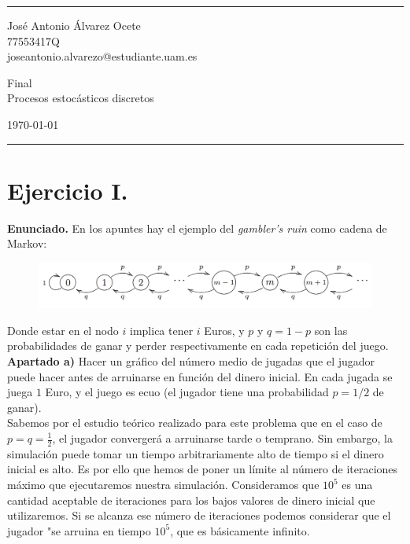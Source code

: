 \documentclass[a4paper]{article}
\begin{document}
	

\fancyhead[C]{}
\hrule \medskip %
\begin{minipage}{0.295\textwidth} 
	\raggedright
	\footnotesize
	José Antonio Álvarez Ocete \hfill\\   
	77553417Q \hfill\\
	joseantonio.alvarezo@estudiante.uam.es
\end{minipage}
\begin{minipage}{0.4\textwidth} 
	\centering 
	\large 
	Final \\ 
	\normalsize 
	Procesos estocásticos discretos\\ 
\end{minipage}
\begin{minipage}{0.295\textwidth} 
	\raggedleft
	\today\hfill\\
\end{minipage}
\medskip\hrule 
\bigskip


\section*{Ejercicio I.}

\textbf{Enunciado.} En los apuntes hay el ejemplo del \emph{gambler's ruin} como cadena de Markov:

\begin{figure}[H]
	\includegraphics[scale=.6]{figures/gamblers_ruin}
	\centering
\end{figure}

Donde estar en el nodo $i$ implica tener $i$ Euros, y $p$ y $q=1-p$ son las probabilidades de ganar y perder respectivamente en cada repetición del juego. \\

\textbf{Apartado a)} Hacer un gráfico del número medio de jugadas que el jugador puede hacer antes de arruinarse en función del dinero inicial. En cada jugada se juega $1$ Euro, y el juego es ecuo (el jugador tiene una probabilidad $p=1/2$ de ganar). \\

Sabemos por el estudio teórico realizado para este problema que en el caso de $p=q=\frac{1}{2}$, el jugador convergerá a arruinarse tarde o temprano. Sin embargo, la simulación puede tomar un tiempo arbitrariamente alto de tiempo si el dinero inicial es alto. Es por ello que hemos de poner un límite al número de iteraciones máximo que ejecutaremos nuestra simulación. Consideramos que $10^5$ es una cantidad aceptable de iteraciones para los bajos valores de dinero inicial que utilizaremos. Si se alcanza ese número de iteraciones podemos considerar que el jugador "se arruina en tiempo $10^5$, que es básicamente infinito. \\
\end{document}
